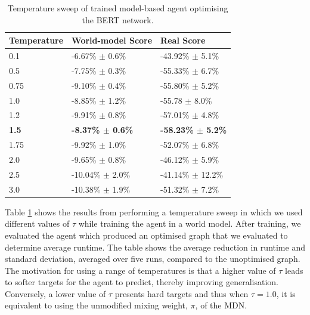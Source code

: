 \begin{table}[]
  \centering
  \begin{tabular}{@{}lll@{}}
  \toprule
  Temperature  & World-model Score        & Real Score                \\ \midrule
  0.1          & -6.67\% $\pm$ 0.6\%          & -43.92\% $\pm$ 5.1\%         \\
  0.5          & -7.75\% $\pm$ 0.3\%          & -55.33\% $\pm$ 6.7\%         \\
  0.75         & -9.10\% $\pm$ 0.4\%          & -55.80\% $\pm$ 5.2\%         \\
  1.0          & -8.85\% $\pm$ 1.2\%          & -55.78 $\pm$ 8.0\%           \\
  1.2          & -9.91\% $\pm$ 0.8\%          & -57.01\% $\pm$ 4.8\%         \\
  \textbf{1.5} & \textbf{-8.37\% $\mathbf{\pm}$ 0.6\%} & \textbf{-58.23\% $\mathbf{\pm}$ 5.2\%} \\
  1.75         & -9.92\% $\pm$ 1.0\%          & -52.07\% $\pm$ 6.8\%         \\
  2.0          & -9.65\% $\pm$ 0.8\%          & -46.12\% $\pm$ 5.9\%         \\
  2.5          & -10.04\% $\pm$ 2.0\%         & -41.14\% $\pm$ 12.2\%         \\
  3.0          & -10.38\% $\pm$ 1.9\%         & -51.32\% $\pm$ 7.2\%         \\ \bottomrule
  \end{tabular}
  \caption[Rewards using range of temperatures]{Temperature sweep of trained model-based agent optimising the BERT network.}
  \label{table:eval:agent-temperatures}
\end{table}

Table \ref{table:eval:agent-temperatures} shows the results from performing a temperature sweep in which we used different values of $\tau$ while training the agent in a world model. After training, we evaluated the agent which produced an optimised graph that we evaluated to determine average runtime. The table shows the average reduction in runtime and standard deviation, averaged over five runs, compared to the unoptimised graph. The motivation for using a range of temperatures is that a higher value of $\tau$ leads to softer targets for the agent to predict, thereby improving generalisation. Conversely, a lower value of $\tau$ presents hard targets and thus when $\tau = 1.0$, it is equivalent to using the unmodified mixing weight, $\pi$, of the MDN.

